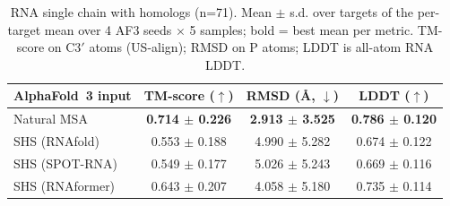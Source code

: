 \begin{table}[htbp]
\centering
\caption{RNA single chain with homologs (n=71). Mean $\pm$ s.d. over targets of the per-target mean over 4 AF3 seeds $\times$ 5 samples; bold = best mean per metric. TM-score on C3$'$ atoms (US-align); RMSD on P atoms; LDDT is all-atom RNA LDDT.}
\label{tab:rna_single_chain_with_homologs}
\begin{tabular}{lccc}
\toprule
AlphaFold~3 input & TM-score ($\uparrow$) & RMSD (\AA, $\downarrow$) & LDDT ($\uparrow$) \\
\midrule
Natural MSA & \textbf{0.714 $\pm$ 0.226} & \textbf{2.913 $\pm$ 3.525} & \textbf{0.786 $\pm$ 0.120} \\
SHS (RNAfold) & 0.553 $\pm$ 0.188 & 4.990 $\pm$ 5.282 & 0.674 $\pm$ 0.122 \\
SHS (SPOT-RNA) & 0.549 $\pm$ 0.177 & 5.026 $\pm$ 5.243 & 0.669 $\pm$ 0.116 \\
SHS (RNAformer) & 0.643 $\pm$ 0.207 & 4.058 $\pm$ 5.180 & 0.735 $\pm$ 0.114 \\
\bottomrule
\end{tabular}
\end{table}
